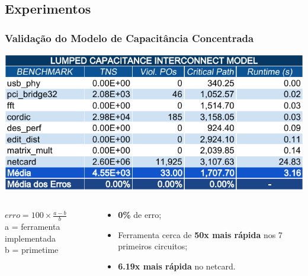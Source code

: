 \documentclass[10pt,a4paper]{beamer}
\begin{document}
		\subsection*{Experimentos}
		\begin{frame}[t]
			\frametitle{Validação do Modelo de Capacitância Concentrada}
			\vspace{-.5cm}
			\begin{center}
				\includegraphics[width=0.9\linewidth]{img/lumped_capacitance_vs_primetime.pdf} 
			\end{center}
			\vspace{-.5cm}
			\begin{columns}
				\begin{column}{0.4\textwidth}
					\begin{shaded}
						$erro = 100 \times \frac{a - b}{ b } $ \\
						\small{a = ferramenta implementada} \\
						\small{b = primetime}
					\end{shaded}
				\end{column}
				\begin{column}{0.6\textwidth}
					\begin{itemize}
						\item \textbf{0\%} de erro;
						\item Ferramenta cerca de \textbf{50x mais rápida} nos 7 primeiros circuitos;
						\item \textbf{6.19x mais rápida} no netcard.
					\end{itemize}
				\end{column}
			\end{columns}
			
			
		\end{frame}
		
\end{document}
